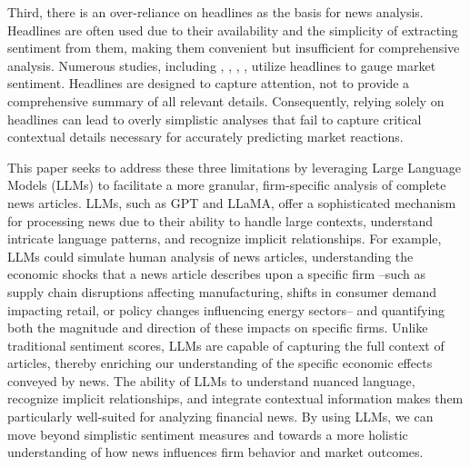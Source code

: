 Third, there is an over-reliance on headlines as the basis for news analysis. Headlines are often used due to their availability and the simplicity of extracting sentiment from them, making them convenient but insufficient for comprehensive analysis. Numerous studies, including 
\cite{chan2003stock}, \cite{oncharoen2018deep}, \cite{wei2018stock}, \cite{lopez2023can}, \cite{chen2022expected} 
utilize headlines to gauge market sentiment.  Headlines are designed to capture attention, not to provide a comprehensive summary of all relevant details. Consequently, relying solely on headlines can lead to overly simplistic analyses that fail to capture critical contextual details necessary for accurately predicting market reactions.

This paper seeks to address these three limitations by leveraging Large Language Models (LLMs) to facilitate a more granular, firm-specific analysis of complete news articles. LLMs, such as GPT and LLaMA, offer a sophisticated mechanism for processing news due to their ability to handle large contexts, understand intricate language patterns, and recognize implicit relationships. For example, LLMs could simulate human analysis of news articles, understanding the economic shocks that a news article describes upon a specific firm --such as supply chain disruptions affecting manufacturing, shifts in consumer demand impacting retail, or policy changes influencing energy sectors-- and quantifying both the magnitude and direction of these impacts on specific firms. Unlike traditional sentiment scores, LLMs are capable of capturing the full context of articles, thereby enriching our understanding of the specific economic effects conveyed by news. The ability of LLMs to understand nuanced language, recognize implicit relationships, and integrate contextual information makes them particularly well-suited for analyzing financial news. By using LLMs, we can move beyond simplistic sentiment measures and towards a more holistic understanding of how news influences firm behavior and market outcomes.

